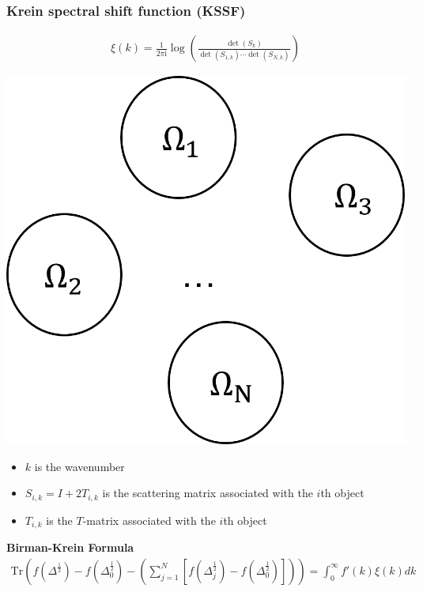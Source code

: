 \documentclass[dvipsnames,10pt]{beamer}
\begin{document}
\begin{frame}
    \frametitle{Krein spectral shift function (KSSF)}
    \vspace{0.3cm}
    \begin{minipage}{5cm}
    
    \begin{align*}
    \xi(k) = \frac{1}{2\pi \mathrm{i}}\log\left(\frac{\det(S_{k})}{\det(S_{1,k})\cdots\det(S_{N,k})}\right)
\end{align*}
    \end{minipage}
    \begin{minipage}{2cm}
        \includegraphics[scale = 0.5]{figs/Domain.png}
    \end{minipage}

\begin{itemize}
    \item $k$ is the wavenumber
    \item $S_{i,k} = I + 2T_{i,k}$ is the scattering matrix associated with the $i$th object
    \item $T_{i,k}$ is the $T$-matrix associated with the $i$th object
\end{itemize}
\begin{tcolorbox}
\textbf{Birman-Krein Formula}
    \begin{align*}
    \text{Tr}\left(f(\Delta^{\frac{1}{2}}) - f(\Delta_{0}^{\frac{1}{2}}) - \left(\sum_{j = 1}^{N}[f(\Delta_{j}^{\frac{1}{2}}) - f(\Delta_{0}^{\frac{1}{2}})]\right)\right)  = \int_{0}^{\infty}f'(k)\xi(k)dk
\end{align*}
\end{tcolorbox}

\end{frame}
\end{document}
